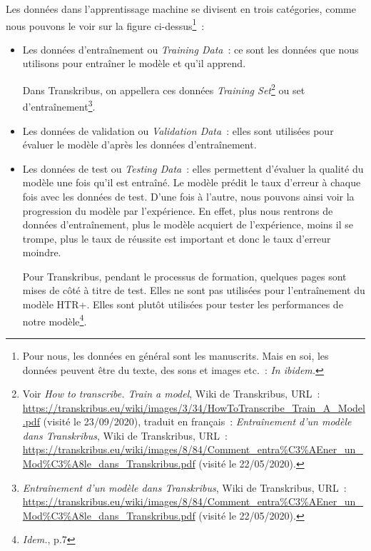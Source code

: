 Les données dans l'apprentissage machine se divisent en trois catégories, comme nous pouvons le voir sur la figure ci-dessus\footnote{Pour nous, les données en général sont les manuscrits. Mais en soi, les données peuvent être du texte, des sons et images etc.~:  \emph{In ibidem.}}~: 
\begin{itemize}
    \item Les données d'entraînement ou \emph{Training Data}~: ce sont les données que nous utilisons pour entraîner le modèle et qu'il apprend.
    
    Dans Transkribus, on appellera ces données \emph{Training Set}\footnote{Voir \emph{How to transcribe. Train a model}, Wiki de Transkribus, URL~: \url{https://transkribus.eu/wiki/images/3/34/HowToTranscribe_Train_A_Model.pdf} (visité le 23/09/2020), traduit en français~: \emph{Entraînement d’un modèle dans Transkribus}, Wiki de Transkribus, URL~: \url{https://transkribus.eu/wiki/images/8/84/Comment_entra\%C3\%AEner_un_Mod\%C3\%A8le_dans_Transkribus.pdf} (visité le 22/05/2020).} ou set d'entraînement\footnote{\emph{Entraînement d’un modèle dans Transkribus}, Wiki de Transkribus, URL~: \url{https://transkribus.eu/wiki/images/8/84/Comment_entra\%C3\%AEner_un_Mod\%C3\%A8le_dans_Transkribus.pdf} (visité le 22/05/2020).}. 
    
    \item Les données de validation ou \emph{Validation Data}~: elles sont utilisées pour évaluer le modèle d'après les données d'entraînement.
    
    \item Les données de test ou \emph{Testing Data}~: elles permettent d'évaluer la qualité du modèle une fois qu'il est entraîné. Le modèle prédit le taux d'erreur à chaque fois avec les données de test. D'une fois à l'autre, nous pouvons ainsi voir la progression du modèle par l'expérience. En effet, plus nous rentrons de données d'entraînement, plus le modèle acquiert de l'expérience, moins il se trompe, plus le taux de réussite est important et donc le taux d'erreur moindre.
    
    Pour Transkribus, pendant le processus de formation, quelques pages sont mises de côté à titre de test. Elles ne sont pas utilisées pour l'entraînement du modèle HTR+. Elles sont plutôt utilisées pour tester les performances de notre modèle\footnote{\emph{Idem.}, p.7}.
\end{itemize}

